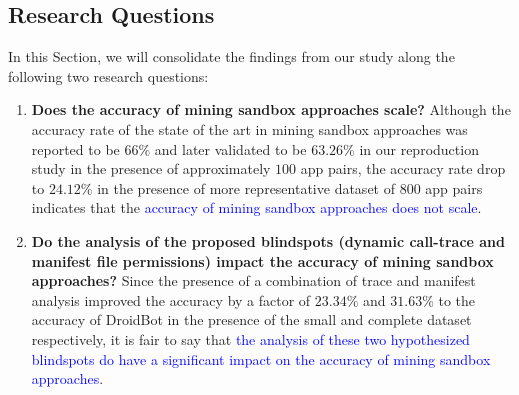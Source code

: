 





\subsection{Research Questions}
In this Section, we will consolidate the findings from our study along the following two research questions:

\begin{enumerate}
  \item \textbf{Does the accuracy of mining sandbox approaches scale? } Although the accuracy rate of the state of the art in mining sandbox approaches was reported to be $66\%$ and later validated to be $63.26\%$ in our reproduction study in the presence of approximately $100$ app pairs, the accuracy rate drop to $24.12\%$ in the presence of more representative dataset of $800$ app pairs indicates that the \textcolor{blue}{accuracy of mining sandbox approaches does not scale}.

  \item \textbf{Do the analysis of the proposed blindspots (dynamic call-trace and manifest file permissions) impact the accuracy of mining sandbox approaches?} Since the presence of a combination of trace and manifest analysis improved the accuracy by a factor of $23.34\%$ and $31.63\%$ to the accuracy of DroidBot in the presence of the small and complete dataset respectively, it is fair to say that \textcolor{blue}{the analysis of these two hypothesized blindspots do have a significant impact on the accuracy of mining sandbox approaches}. 
\end{enumerate}


